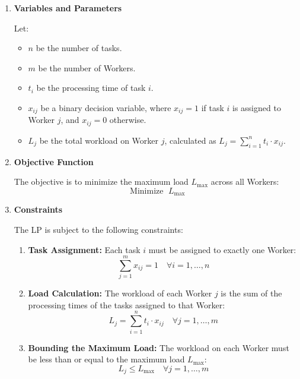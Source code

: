 \begin{enumerate}
    \item \textbf{Variables and Parameters}

Let:
\begin{itemize}
    \item \( n \) be the number of tasks.
    \item \( m \) be the number of Workers.
    \item \( t_i \) be the processing time of task \( i \).
    \item \( x_{ij} \) be a binary decision variable, where \( x_{ij} = 1 \) if task \( i \) is assigned to Worker \( j \), and \( x_{ij} = 0 \) otherwise.
    \item \( L_j \) be the total workload on Worker \( j \), calculated as \( L_j = \sum_{i=1}^{n} t_i \cdot x_{ij} \).
\end{itemize}

\item \textbf{Objective Function}

The objective is to minimize the maximum load \( L_{\mathrm{max}} \) across all Workers:
\begin{equation}
\operatorname{Minimize\ } L_{\text{max}}
\end{equation}

\item \textbf{Constraints}

The \ac{LP} is subject to the following constraints:

\begin{enumerate}
    \item \textbf{Task Assignment:} Each task \( i \) must be assigned to exactly one Worker:
    \begin{equation}
    \sum_{j=1}^{m} x_{ij} = 1 \quad \forall i = 1, \dots, n
    \end{equation}

    \item \textbf{Load Calculation:} The workload of each Worker \( j \) is the sum of the processing times of the tasks assigned to that Worker:
    \begin{equation}
    L_j = \sum_{i=1}^{n} t_i \cdot x_{ij} \quad \forall j = 1, \dots, m
    \end{equation}

    \item \textbf{Bounding the Maximum Load:} The workload on each Worker must be less than or equal to the maximum load \( L_{\text{max}} \):
    \begin{equation}
    L_j \leq L_{\text{max}} \quad \forall j = 1, \dots, m
    \end{equation}
    

\end{enumerate}
\end{enumerate}
